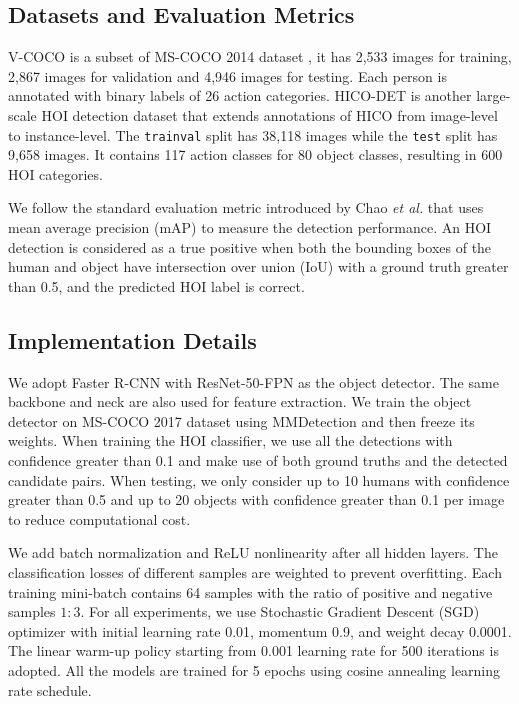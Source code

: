 \documentclass[sigconf,screen]{acmart}
\begin{document}
\subsection{Datasets and Evaluation Metrics}

V-COCO is a subset of MS-COCO 2014 dataset \cite{lin2014microsoft}, it has 2,533 images for training, 2,867 images for validation and 4,946 images for testing. Each person is annotated with binary labels of 26 action categories. HICO-DET is another large-scale HOI detection dataset that extends annotations of HICO \cite{chao2015hico} from image-level to instance-level. The \verb|trainval| split has 38,118 images while the \verb|test| split has 9,658 images. It contains 117 action classes for 80 object classes, resulting in 600 HOI categories.

We follow the standard evaluation metric introduced by Chao \textit{et al.} \cite{chao2018learning} that uses mean average precision (mAP) to measure the detection performance. An HOI detection is considered as a true positive when both the bounding boxes of the human and object have intersection over union (IoU) with a ground truth greater than 0.5, and the predicted HOI label is correct.

\subsection{Implementation Details}

We adopt Faster R-CNN \cite{ren2015faster} with ResNet-50-FPN as the object detector. The same backbone and neck are also used for feature extraction. We train the object detector on MS-COCO 2017 dataset using MMDetection \cite{chen2019mmdetection} and then freeze its weights. When training the HOI classifier, we use all the detections with confidence greater than 0.1 and make use of both ground truths and the detected candidate pairs. When testing, we only consider up to 10 humans with confidence greater than 0.5 and up to 20 objects with confidence greater than 0.1 per image to reduce computational cost.

We add batch normalization \cite{ioffe2015batch} and ReLU nonlinearity \cite{glorot2011deep} after all hidden layers. The classification losses of different samples are weighted to prevent overfitting. Each training mini-batch contains 64 samples with the ratio of positive and negative samples $1 : 3$. For all experiments, we use Stochastic Gradient Descent (SGD) optimizer with initial learning rate 0.01, momentum 0.9, and weight decay 0.0001. The linear warm-up policy starting from 0.001 learning rate for 500 iterations is adopted. All the models are trained for 5 epochs using cosine annealing learning rate schedule.
\end{document}
